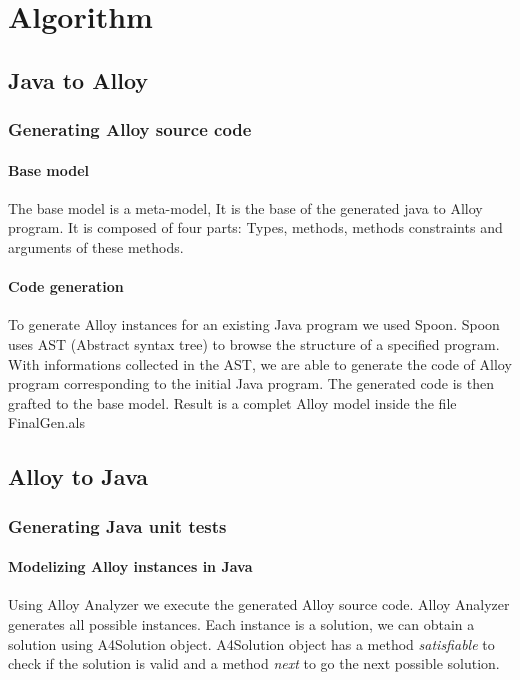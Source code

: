 \section{Algorithm}
\label{sec:Algorithm}
\subsection{Java to Alloy}
\subsubsection{Generating Alloy source code}
\paragraph{Base model}
The base model is a meta-model, It is the base of the generated java to Alloy program.
It is composed of four parts: Types, methods, methods constraints and arguments of these methods.


\paragraph{Code generation}
To generate Alloy instances for an existing Java program we used Spoon. Spoon uses AST (Abstract syntax tree)\cite{ast} to browse the structure of a specified program. With informations collected in the AST, we are able to generate the code of Alloy program corresponding to the initial Java program. The generated code is then grafted to the base model.
Result is a complet Alloy model inside the file FinalGen.als

\subsection{Alloy to Java}
\subsubsection{Generating Java unit tests}
\paragraph{Modelizing Alloy instances in Java}
Using Alloy Analyzer we execute the generated Alloy source code. Alloy Analyzer generates all possible instances.
Each instance is a solution, we can obtain a solution using A4Solution object. A4Solution object has a method \textit{satisfiable} to check if the solution is valid and a method \textit{next} to go the next possible solution.


